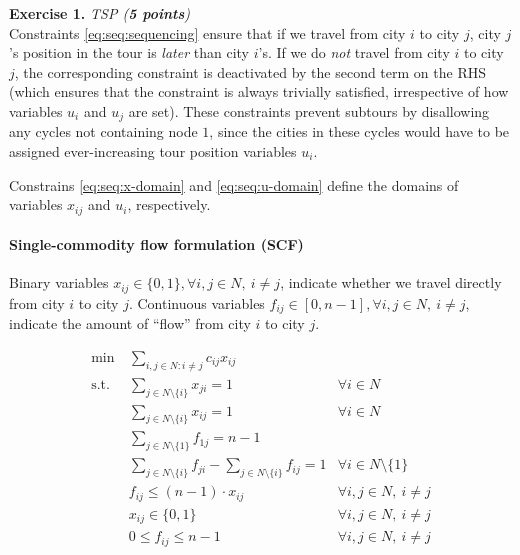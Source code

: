 \documentclass[a4paper]{scrartcl}
\newcounter{exc}
\newenvironment{exercise}[1]%
{\refstepcounter{exc}\textbf{Exercise 1.\arabic{exc}} \emph{#1}\\}
{

\hrulefill\medskip}%
\theoremstyle{definition}
\begin{document}
\begin{exercise}{TSP (\textbf{5 points})}
	Constraints \eqref{eq:seq:sequencing} ensure that if we travel from city $i$ to city $j$, city $j$'s position in the tour is \emph{later} than city $i$'s.
	If we do \emph{not} travel from city $i$ to city $j$, the corresponding constraint is deactivated by the second term on the RHS (which ensures that the constraint is always trivially satisfied, irrespective of how variables $u_i$ and $u_j$ are set).
	These constraints prevent subtours by disallowing any cycles not containing node $1$, since the cities in these cycles would have to be assigned ever-increasing tour position variables $u_i$.
	
	Constrains \eqref{eq:seq:x-domain} and \eqref{eq:seq:u-domain} define the domains of variables $x_{ij}$ and $u_i$, respectively.
	
	
	\paragraph{Single-commodity flow formulation (SCF)}
	
	Binary variables $x_{ij} \in \{0, 1\}, \forall i,j \in N,\ i \neq j$, indicate whether we travel directly from city $i$ to city $j$.
	Continuous variables $f_{ij} \in [0, n-1], \forall i,j \in N,\ i \neq j$, indicate the amount of ``flow'' from city $i$ to city $j$.
	
	\begin{align}
		\min\ & \sum_{i,j \in N: i \neq j} c_{ij} x_{ij} \label{eq:scf:obj} \\
		\text{s.t.}\ & \sum_{j \in N \setminus \{i\}} x_{ji} = 1 \label{eq:scf:incoming-arc} & \forall i \in N \\
		& \sum_{j \in N \setminus \{i\}} x_{ij} = 1 & \forall i \in N \label{eq:scf:outgoing-arc} \\
		& \sum_{j \in N \setminus \{1\}} f_{1j} = n - 1 \label{eq:scf:flow-generation} \\
		& \sum_{j \in N \setminus \{i\}} f_{ji} - \sum_{j \in N \setminus \{i\}} f_{ij} = 1 & \forall i \in N \setminus \{1\} \label{eq:scf:flow-consumption} \\
		& f_{ij} \leq (n-1) \cdot x_{ij} & \forall i,j \in N,\ i \neq j \label{eq:scf:linking} \\
		& x_{ij} \in \{0, 1\} & \forall i,j \in N,\ i \neq j \label{eq:scf:x-domain} \\
		& 0 \leq f_{ij} \leq n - 1 & \forall i,j \in N,\ i \neq j \label{eq:scf:f-domain}
	\end{align}
	

\end{exercise}
\end{document}
